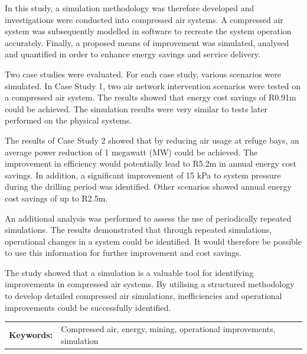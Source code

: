 \documentclass[12pt, english, oneside]{report}%
\begin{document}
	\par
In this study, a simulation methodology was therefore developed and investigations were conducted into compressed air systems. A compressed air system was subsequently modelled in software to recreate the system operation accurately. Finally, a proposed means of improvement was simulated, analysed and quantified in order to enhance energy savings and service delivery.
	 \par
Two case studies were evaluated. For each case study, various scenarios were simulated. In Case Study 1, two air network intervention scenarios were tested on a compressed air system. The results showed that energy cost savings of R0.91m could be achieved. The simulation results were very similar to tests later performed on the physical systems.
	 \par 
The results of Case Study 2 showed that by reducing air usage at refuge bays, an average power reduction of 1 megawatt (MW) could be achieved. The improvement in efficiency would potentially lead to R5.2m in annual energy cost savings. In addition, a significant improvement of 15 kPa to system pressure during the drilling period was identified. Other scenarios showed annual energy cost savings of up to R2.5m.
	 \par 
An additional analysis was performed to assess the use of periodically repeated simulations. The results demonstrated that through repeated simulations, operational changes in a system could be identified. It would therefore be possible to use this information for further improvement and cost savings.
	 \par
The study showed that a simulation is a valuable tool for identifying improvements in compressed air systems. By utilising a structured methodology to develop detailed compressed air simulations, inefficiencies and operational improvements could be successfully identified.
	 \par
	\begin{tabular}{p{}p{}}
		\textbf{Keywords:} & Compressed air, energy, mining, operational improvements, simulation  \\
	\end{tabular}
\clearpage
\end{document}
